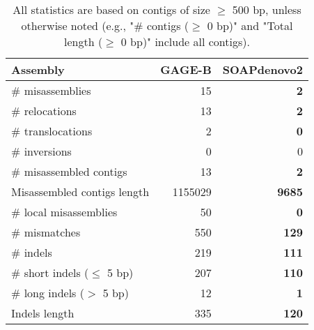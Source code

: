 \documentclass[12pt,a4paper]{article}
\begin{document}
\begin{table}[ht]
\begin{center}
\caption{All statistics are based on contigs of size $\geq$ 500 bp, unless otherwise noted (e.g., "\# contigs ($\geq$ 0 bp)" and "Total length ($\geq$ 0 bp)" include all contigs).}
\begin{tabular}{|l*{2}{|r}|}
\hline
Assembly & GAGE-B & SOAPdenovo2 \\ \hline
\# misassemblies & 15 & {\bf 2} \\ \hline
\hspace{5mm}\# relocations & 13 & {\bf 2} \\ \hline
\hspace{5mm}\# translocations & 2 & {\bf 0} \\ \hline
\hspace{5mm}\# inversions & 0 & 0 \\ \hline
\# misassembled contigs & 13 & {\bf 2} \\ \hline
Misassembled contigs length & 1155029 & {\bf 9685} \\ \hline
\# local misassemblies & 50 & {\bf 0} \\ \hline
\# mismatches & 550 & {\bf 129} \\ \hline
\# indels & 219 & {\bf 111} \\ \hline
\hspace{5mm}\# short indels ($\leq$ 5 bp) & 207 & {\bf 110} \\ \hline
\hspace{5mm}\# long indels ($>$ 5 bp) & 12 & {\bf 1} \\ \hline
Indels length & 335 & {\bf 120} \\ \hline
\end{tabular}
\end{center}
\end{table}
\end{document}
